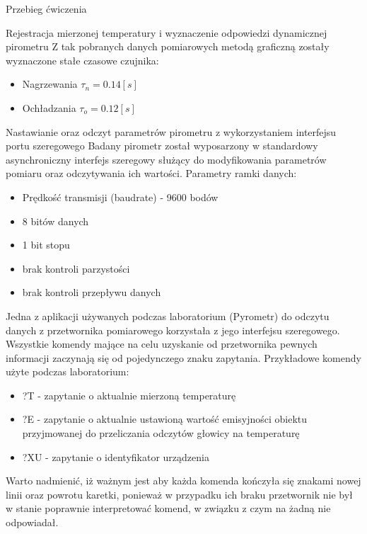 \documentclass[12pt]{article}
\begin{document}
\begin{section}{Przebieg ćwiczenia}
\begin{subsection}{Rejestracja mierzonej temperatury i wyznaczenie odpowiedzi
					dynamicznej pirometru}
		Z tak pobranych danych pomiarowych metodą graficzną zostały wyznaczone stałe
		czasowe czujnika:
		\begin{itemize}
		  \item Nagrzewania $\tau_n = 0.14[s]$
		  \item Ochładzania $\tau_o = 0.12[s]$
		\end{itemize}
	
	\end{subsection}
	
	\newpage
	
	\begin{subsection}{Nastawianie oraz odczyt parametrów pirometru z
					wykorzystaniem interfejsu portu szeregowego}
	Badany pirometr został wyposarzony w standardowy asynchroniczny interfejs
	szeregowy służący do modyfikowania parametrów pomiaru oraz odczytywania ich
	wartości. Parametry ramki danych:
	
	\begin{itemize}
	  \item Prędkość transmisji (baudrate) - 9600 bodów
	  \item 8 bitów danych
	  \item 1 bit stopu
	  \item brak kontroli parzystości
	  \item brak kontroli przepływu danych
	\end{itemize}
	
	Jedna z aplikacji używanych podczas laboratorium (Pyrometr) do
	odczytu danych z przetwornika pomiarowego korzystała z jego interfejsu
	szeregowego. Wszystkie komendy mające na celu uzyskanie od przetwornika pewnych
	informacji zaczynają się od pojedynczego znaku zapytania. Przykładowe komendy
	użyte podczas laboratorium:
	
	\begin{itemize}
	  \item ?T - zapytanie o aktualnie mierzoną temperaturę
	  \item ?E - zapytanie o aktualnie ustawioną wartość emisyjności obiektu
	  przyjmowanej do przeliczania odczytów głowicy na temperaturę
	  \item ?XU - zapytanie o identyfikator urządzenia
	\end{itemize}
	
	Warto nadmienić, iż ważnym jest aby każda komenda kończyła się znakami nowej
	linii oraz powrotu karetki, ponieważ w przypadku ich braku przetwornik nie był
	w stanie poprawnie interpretować komend, w związku z czym na żadną nie
	odpowiadał.
	
	\end{subsection}
	
\end{section}
\end{document}
